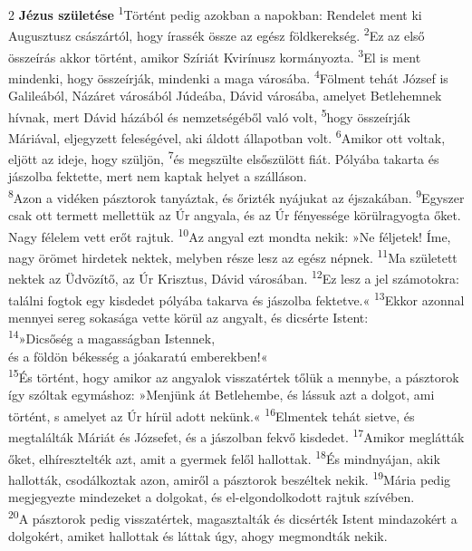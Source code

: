 \documentclass[10pt]{article}
\begin{document}
\begin{multicols}{2}
\lettrine{2}{}
\textbf{Jézus születése} \textsuperscript{1}Történt pedig azokban a napokban: Rendelet ment ki Augusztusz császártól, hogy írassék össze az egész földkerekség.
\textsuperscript{2}Ez az első összeírás akkor történt, amikor Szíriát Kvirínusz kormányozta.  
\textsuperscript{3}El is ment mindenki, hogy összeírják, mindenki a maga városába.  
\textsuperscript{4}Fölment tehát József is Galileából, Názáret városából Júdeába, Dávid városába, amelyet Betlehemnek hívnak, mert Dávid házából és nemzetségéből való volt,  
\textsuperscript{5}hogy összeírják Máriával, eljegyzett feleségével, aki áldott állapotban volt.  
\textsuperscript{6}Amikor ott voltak, eljött az ideje, hogy szüljön,  
\textsuperscript{7}és megszülte elsőszülött fiát. Pólyába takarta és jászolba fektette, mert nem kaptak helyet a szálláson. \\  
\textsuperscript{8}Azon a vidéken pásztorok tanyáztak, és őrizték nyájukat az éjszakában.  
\textsuperscript{9}Egyszer csak ott termett mellettük az Úr angyala, és az Úr fényessége körülragyogta őket. Nagy félelem vett erőt rajtuk.  
\textsuperscript{10}Az angyal ezt mondta nekik: »Ne féljetek! Íme, nagy örömet hirdetek nektek, melyben része lesz az egész népnek.  
\textsuperscript{11}Ma született nektek az Üdvözítő, az Úr Krisztus, Dávid városában.  
\textsuperscript{12}Ez lesz a jel számotokra: találni fogtok egy kisdedet pólyába takarva és jászolba fektetve.«  
\textsuperscript{13}Ekkor azonnal mennyei sereg sokasága vette körül az angyalt, és dicsérte Istent: \\  
\textsuperscript{14}»Dicsőség a magasságban Istennek, \\ és a földön békesség a jóakaratú emberekben!« \\  
\textsuperscript{15}És történt, hogy amikor az angyalok visszatértek tőlük a mennybe, a pásztorok így szóltak egymáshoz: »Menjünk át Betlehembe, és lássuk azt a dolgot, ami történt, s amelyet az Úr hírül adott nekünk.«  
\textsuperscript{16}Elmentek tehát sietve, és megtalálták Máriát és Józsefet, és a jászolban fekvő kisdedet.  
\textsuperscript{17}Amikor meglátták őket, elhíresztelték azt, amit a gyermek felől hallottak.  
\textsuperscript{18}És mindnyájan, akik hallották, csodálkoztak azon, amiről a pásztorok beszéltek nekik.  
\textsuperscript{19}Mária pedig megjegyezte mindezeket a dolgokat, és el-elgondolkodott rajtuk szívében. \\  
\textsuperscript{20}A pásztorok pedig visszatértek, magasztalták és dicsérték Istent mindazokért a dolgokért, amiket hallottak és láttak úgy, ahogy megmondták nekik.

\end{multicols}
\end{document}
